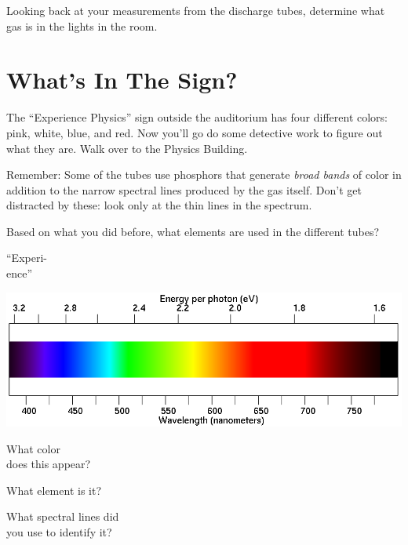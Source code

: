 \documentclass[11pt]{article}
\begin{document}
Looking back at your measurements from the discharge tubes, determine what gas is in the lights in the room. 
\bigskip

\section{ What's In The Sign?}

The ``Experience Physics'' sign outside the auditorium has four different colors: pink, white, blue, and red. Now you'll go do some detective work to figure out what they are. Walk over to the Physics Building.

Remember: Some of the tubes use phosphors that generate {\it broad bands} of color in addition to the narrow spectral
lines produced by the gas itself. Don't get distracted by these: look only at the thin lines in the spectrum.

Based on what you
did before, what elements are used in the different tubes?

\begin{minipage}{0.1\textwidth}
	\begin{center}
		``Experi-\\ence''
	\end{center}
\end{minipage}
\begin{minipage}{0.8\textwidth}
	\includegraphics[width=\textwidth]{spectrum2.png}
\end{minipage}


\begin{minipage}{0.33\textwidth}
	What color \\does this appear?
\end{minipage}
\begin{minipage}{0.33\textwidth}
	What element is it?
\end{minipage}
\begin{minipage}{0.33\textwidth}
	What spectral lines did\\
	you use to identify it?
\end{minipage}
\end{document}
